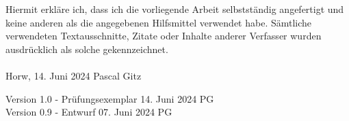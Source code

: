 
Hiermit erkläre ich, dass ich die vorliegende Arbeit selbstständig angefertigt und keine anderen als die angegebenen Hilfsmittel verwendet habe. Sämtliche verwendeten Textausschnitte, Zitate oder Inhalte anderer Verfasser wurden ausdrücklich als solche gekennzeichnet.\\%
%
\\%
%
Horw, 14. Juni 2024 \hfill Pascal Gitz%

\vfill

Version 1.0 - Prüfungsexemplar \hfill 14. Juni 2024 \quad \quad \quad \quad \quad PG\\
Version 0.9 - Entwurf \hfill 07. Juni 2024 \quad \quad \quad \quad \quad PG\\

\newpage
